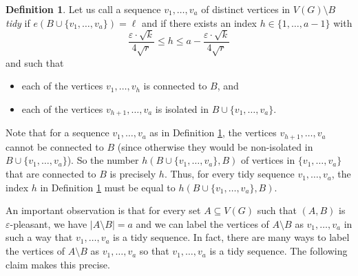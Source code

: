 \documentclass[11pt]{article}
\theoremstyle{definition}
\newtheorem{definition}[theorem]{Definition}
\numberwithin{equation}{section}
\begin{document}
\begin{definition}\label{defi-tidy-sequence} Let us call a sequence $v_1,\dots,v_a$ of distinct vertices in $V(G)\setminus B$ \emph{tidy} if $e(B\cup \lbrace v_1,\dots,v_a\rbrace)=\ell$ and if there exists an index $h\in \lbrace 1,\dots,a-1\rbrace$ with
\[\frac{\varepsilon\cdot \sqrt{k}}{4\sqrt{r}}\leq h\leq a-\frac{\varepsilon\cdot \sqrt{k}}{4\sqrt{r}}\]
and such that
\begin{itemize}
\item each of the vertices $v_1,\dots,v_{h}$ is connected to $B$, and
\item each of the vertices $v_{h+1},\dots,v_{a}$ is isolated in $B\cup \lbrace v_1,\dots,v_a\rbrace$.
\end{itemize}
\end{definition}

Note that for a sequence $v_1,\dots,v_a$ as in Definition \ref{defi-tidy-sequence}, the vertices $v_{h+1},\dots,v_a$ cannot be connected to $B$ (since otherwise they would be non-isolated in $B\cup \lbrace v_1,\dots,v_a\rbrace$). So the number $h(B\cup \lbrace v_1,\dots,v_a\rbrace, B)$ of vertices in $\lbrace v_1,\dots,v_a\rbrace$ that are connected to $B$ is precisely $h$. Thus, for every tidy sequence $v_1,\dots,v_a$, the index $h$ in Definition \ref{defi-tidy-sequence} must be equal to $h(B\cup \lbrace v_1,\dots,v_a\rbrace, B)$.

An important observation is that for every set $A\subseteq V(G)$ such that $(A,B)$ is $\varepsilon$-pleasant, we have $\vert A\setminus B\vert = a$ and we can label the vertices of $A\setminus B$ as $v_1,\dots,v_a$ in such a way that $v_1,\dots,v_a$ is a tidy sequence. In fact, there are many ways to label the vertices of $A\setminus B$ as $v_1,\dots,v_a$ so that $v_1,\dots,v_a$ is a tidy sequence. The following claim makes this precise.
\end{document}
